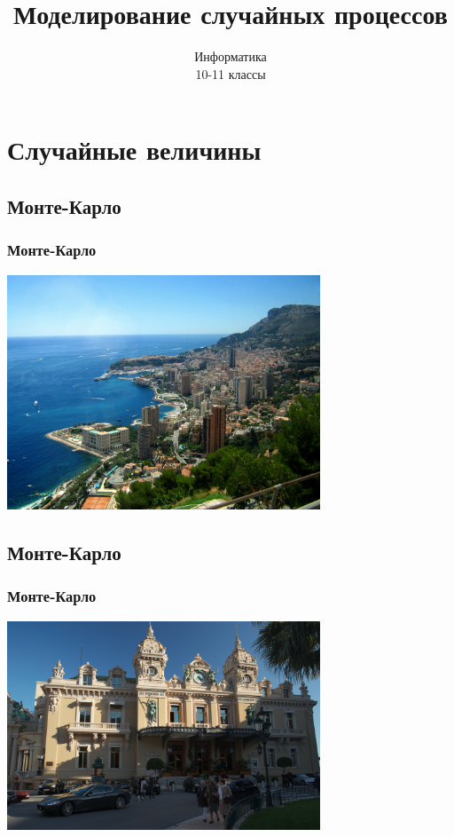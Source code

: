 \documentclass[compress,red]{beamer}
\title{Моделирование случайных процессов}
\author{Информатика \\ 10-11 классы}
\begin{document}
\maketitle

\section{Случайные величины}

\subsection{Монте-Карло}
\begin{frame}[fragile]
  \frametitle{Монте-Карло}
  \centerline{\includegraphics[width=0.7\textwidth]{images/monaco-01.jpg}}
\end{frame}

\subsection{Монте-Карло}
\begin{frame}[fragile]
  \frametitle{Монте-Карло}
  \centerline{\includegraphics[width=0.7\textwidth]{images/monaco-02.jpg}}
\end{frame}
\end{document}
